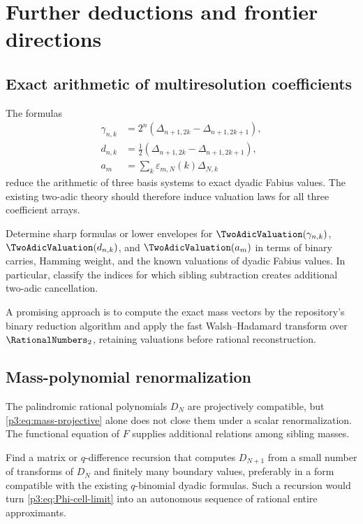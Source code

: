 \documentclass[11pt]{article}
\theoremstyle{definition}
\theoremstyle{remark}
\begin{document}
\section{Further deductions and frontier directions}
\label{p3:sec:frontiers}

\subsection{Exact arithmetic of multiresolution coefficients}

The formulas
\begin{align*}
 \gamma_{n,k}&=2^n(\Delta_{n+1,2k}-\Delta_{n+1,2k+1}),\\
 d_{n,k}&=\tfrac12(\Delta_{n+1,2k}-\Delta_{n+1,2k+1}),\\
 a_m&=\sum_k\varepsilon_{m,N}(k)\Delta_{N,k}
\end{align*}
reduce the arithmetic of three basis systems to exact dyadic Fabius values.
The existing two-adic theory should therefore induce valuation laws for all
three coefficient arrays.

\begin{openproblem}
\label{p3:op:two-adic-spectrum}
Determine sharp formulas or lower envelopes for
$\TwoAdicValuation(\gamma_{n,k})$, $\TwoAdicValuation(d_{n,k})$, and
$\TwoAdicValuation(a_m)$ in terms of binary carries,
Hamming weight, and the known valuations of dyadic Fabius values.  In
particular, classify the indices for which sibling subtraction creates
additional two-adic cancellation.
\end{openproblem}

A promising approach is to compute the exact mass vectors by the repository's
binary reduction algorithm and apply the fast Walsh--Hadamard transform over
$\RationalNumbers_2$, retaining valuations before rational reconstruction.

\subsection{Mass-polynomial renormalization}

The palindromic rational polynomials $D_N$ are projectively compatible, but
\eqref{p3:eq:mass-projective} alone does not close them under a scalar
renormalization.  The functional equation of $F$ supplies additional relations
among sibling masses.

\begin{openproblem}
\label{p3:op:DN-recursion}
Find a matrix or $q$-difference recursion that computes $D_{N+1}$ from a small
number of transforms of $D_N$ and finitely many boundary values, preferably in
a form compatible with the existing $q$-binomial dyadic formulas.  Such a
recursion would turn \eqref{p3:eq:Phi-cell-limit} into an autonomous sequence of
rational entire approximants.
\end{openproblem}
\end{document}
